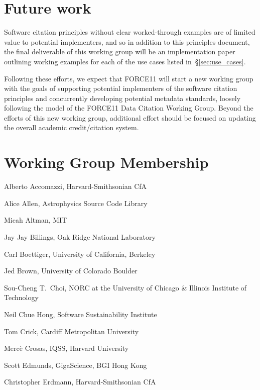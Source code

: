 \documentclass[12pt, oneside]{amsart}
\begin{document}
\section{Future work}
\label{sec:futurework}

Software citation principles without clear worked-through examples are of
limited value to potential implementers, and so in addition to this principles
document, the final deliverable of this working group will be an implementation
paper outlining working examples for each of the use cases listed in~\S\ref{sec:use_cases}.

Following these efforts, we expect that FORCE11 will start a new working group
with the goals of supporting potential implementers of the software citation
principles and concurrently developing potential metadata standards, loosely following the model
of the FORCE11 Data Citation Working Group.
Beyond the efforts of this new working group, additional effort should be focused on updating the overall academic credit\slash citation system.


\appendix

\section{Working Group Membership}
\label{app:wg_members}

Alberto Accomazzi, Harvard-Smithsonian CfA

Alice Allen, Astrophysics Source Code Library

Micah Altman, MIT

Jay Jay Billings, Oak Ridge National Laboratory

Carl Boettiger, University of California,  Berkeley

Jed Brown, University of Colorado Boulder

Sou-Cheng T.~Choi, NORC at the University of Chicago \& Illinois Institute of Technology

Neil Chue Hong, Software Sustainability Institute

Tom Crick, Cardiff Metropolitan University

Merc\`e Crosas, IQSS, Harvard University

Scott Edmunds, GigaScience, BGI Hong Kong

Christopher Erdmann, Harvard-Smithsonian CfA
\end{document}
